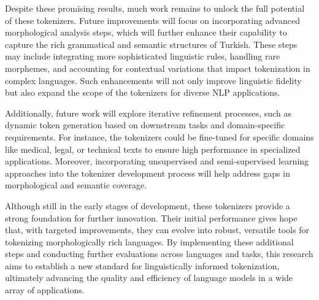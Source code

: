 \documentclass{article}
\begin{document}
  \begin{table}[h]
  \centering
  \caption{Performance Metrics of Tokenizers at Initial Development Stage}
  \label{tab:future-tokenizers}
  \end{table}
  
  Despite these promising results, much work remains to unlock the full potential of these tokenizers. Future improvements will focus on incorporating advanced morphological analysis steps, which will further enhance their capability to capture the rich grammatical and semantic structures of Turkish. These steps may include integrating more sophisticated linguistic rules, handling rare morphemes, and accounting for contextual variations that impact tokenization in complex languages. Such enhancements will not only improve linguistic fidelity but also expand the scope of the tokenizers for diverse NLP applications.
  
  Additionally, future work will explore iterative refinement processes, such as dynamic token generation based on downstream tasks and domain-specific requirements. For instance, the tokenizers could be fine-tuned for specific domains like medical, legal, or technical texts to ensure high performance in specialized applications. Moreover, incorporating unsupervised and semi-supervised learning approaches into the tokenizer development process will help address gaps in morphological and semantic coverage.
  
  Although still in the early stages of development, these tokenizers provide a strong foundation for further innovation. Their initial performance gives hope that, with targeted improvements, they can evolve into robust, versatile tools for tokenizing morphologically rich languages. By implementing these additional steps and conducting further evaluations across languages and tasks, this research aims to establish a new standard for linguistically informed tokenization, ultimately advancing the quality and efficiency of language models in a wide array of applications.



\end{document}
